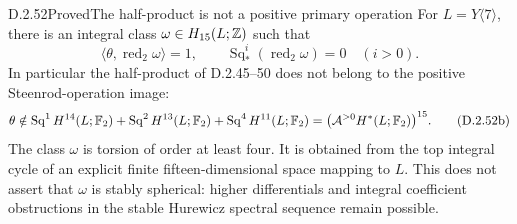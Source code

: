 \begin{claim}{D.2.52}{Proved}{The half-product is not a positive primary operation}
For $L=Y\langle7\rangle$, there is an integral class
$\omega\in H_{15}(L;\mathbb Z)$ such that
\[
 \langle\theta,\operatorname{red}_2\omega\rangle=1,
 \qquad
 \operatorname{Sq}_*^i(\operatorname{red}_2\omega)=0
                           \quad(i>0).
 \tag{D.2.52a}
\]
In particular the half-product of D.2.45--50 does not belong to
the positive Steenrod-operation image:
\[
 \theta\notin
 \operatorname{Sq}^1H^{14}(L;\mathbb F_2)
 +\operatorname{Sq}^2H^{13}(L;\mathbb F_2)
 +\operatorname{Sq}^4H^{11}(L;\mathbb F_2)
       =\bigl(\mathcal A^{>0}H^*(L;\mathbb F_2)\bigr)^{15}.
 \tag{D.2.52b}
\]
The class $\omega$ is torsion of order at least four.
It is obtained from the top integral cycle of an explicit
finite fifteen-dimensional space mapping to $L$.
This does not assert that $\omega$ is stably spherical:
higher differentials and integral coefficient obstructions
in the stable Hurewicz spectral sequence remain possible.
\end{claim}

